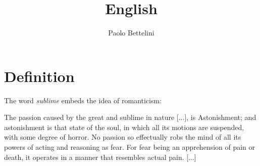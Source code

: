 \documentclass[a4paper]{article}
\title{English}
\author{Paolo Bettelini}
\date{}
\begin{document}
\maketitle
\tableofcontents
\pagebreak

\section{Definition}



The word \textit{sublime} embeds the idea of romanticism:

The passion caused by the great and sublime in nature [...], is Astonishment;
and astonishment is that state of the soul,
in which all its motions are suspended,
with some degree of horror.
No passion so effectually robs the mind of all its powers of acting and reasoning as fear.
For fear being an apprehension of pain or death,
it operates in a manner that resembles actual pain. [...] %
\end{document}
